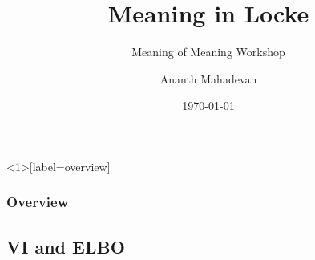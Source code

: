 \documentclass[pdf]{beamer}
\title{Meaning in Locke}
\subtitle[]{Meaning of Meaning Workshop}
\author{Ananth Mahadevan}
\date{\today}
\begin{document}
\begin{frame}
    \titlepage
\end{frame}



\section{}

\begin{frame}<1>[label=overview]
  \frametitle{Overview}
  
\end{frame}


\subsection{VI and ELBO}
\end{document}
